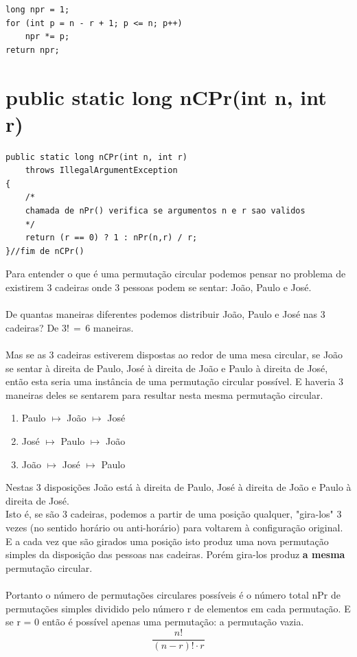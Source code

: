 \documentclass[a4paper,12pt,openany]{book}
\begin{document}
\begin{lstlisting}
long npr = 1;
for (int p = n - r + 1; p <= n; p++)
	npr *= p;
return npr;
\end{lstlisting} 

\section*{public static long nCPr(int n, int r)}
\label{metodo:nCPr01}


\begin{lstlisting}
public static long nCPr(int n, int r)
	throws IllegalArgumentException
{
	/*
	chamada de nPr() verifica se argumentos n e r sao validos
	*/
	return (r == 0) ? 1 : nPr(n,r) / r; 
}//fim de nCPr()
\end{lstlisting} 

Para entender o que é uma permutação circular podemos pensar no problema de existirem 3 cadeiras onde 3 pessoas podem se sentar: João, Paulo e José.
\\
\\
De quantas maneiras diferentes podemos distribuir João, Paulo e José nas 3 cadeiras? De $3!\,=\,6$ maneiras.
\\
\\
Mas se as 3 cadeiras estiverem dispostas ao redor de uma mesa circular, se João se sentar à direita de Paulo, José à direita de João e Paulo à direita de José, então esta seria uma instância de uma permutação circular possível. E haveria 3 maneiras deles se sentarem para resultar nesta mesma permutação circular.
\\
\begin{enumerate}
	\item Paulo $\mapsto$ João $\mapsto$ José
	\item José $\mapsto$ Paulo $\mapsto$ João
	\item João $\mapsto$ José $\mapsto$ Paulo
\end{enumerate}

Nestas 3 disposições João está à direita de Paulo, José à direita de João e Paulo à direita de José.
\\
 Isto é, se são 3 cadeiras, podemos a partir de uma posição qualquer,  "gira-los" 3 vezes (no sentido horário ou anti-horário) para voltarem à configuração original. E a cada vez que são girados uma posição isto produz uma nova permutação simples da disposição das pessoas nas cadeiras. Porém gira-los produz \textbf{a mesma} permutação circular.
\\
\\
Portanto o número de permutações circulares possíveis é o número total nPr de permutações simples dividido pelo número r de elementos em cada permutação. E se r = 0 então é possível apenas uma permutação: a permutação vazia.
$$
\frac{n!}{(n-r)! \cdot r}
$$
\end{document}
